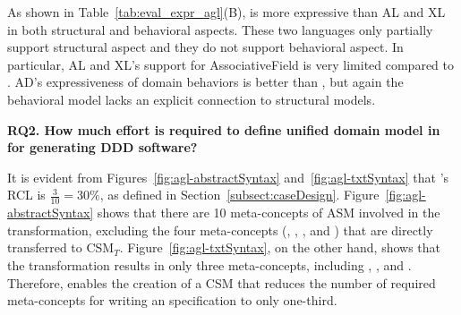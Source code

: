 As shown in Table~\ref{tab:eval_expr_agl}(B), \agldcsl is more expressive than AL and XL in both structural and behavioral aspects. These two languages only partially support structural aspect and they do not support behavioral aspect. In particular, AL and XL's support for AssociativeField is very limited compared to \agldcsl. AD's expressiveness of domain behaviors is better than \agl, but again the behavioral model lacks an explicit connection to structural models.


\noindent \textbf{RQ2. How much effort is required to define unified domain model in \agldcsl for generating DDD software?}


It is evident from Figures~\ref{fig:agl-abstractSyntax} and~\ref{fig:agl-txtSyntax} that \agl's RCL is $\frac{3}{10}=30\%$, as defined in Section~\ref{subsect:caseDesign}. Figure~\ref{fig:agl-abstractSyntax} shows that there are 10 meta-concepts of ASM involved in the transformation, excluding the four meta-concepts (, , , and ) that are directly transferred to CSM$_T$. Figure~\ref{fig:agl-txtSyntax}, on the other hand, shows that the transformation results in only three meta-concepts, including , , and . Therefore, \agl enables the creation of a CSM that reduces the number of required meta-concepts for writing an \agl specification to only one-third.


